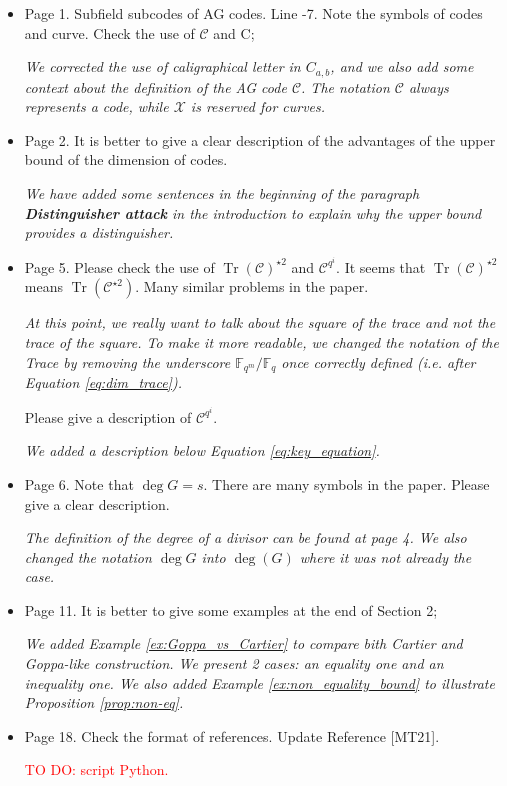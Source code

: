 \documentclass[12pt,a4paper]{amsart}
\newcommand\TODO[1]{\textcolor{red}{TO DO: #1}}
\DeclareMathOperator{\trace}{Tr}
\newcommand{\calC}{\mathcal{C}}
\newcommand{\calX}{\mathcal{X}}
\newcommand{\Tr}[1]{\trace\!\left(#1\right)}
\begin{document}
\begin{itemize}
 
\item  Page 1. Subfield subcodes of AG codes. Line -7. Note the symbols of codes and curve. Check the use of $\calC$ and C; 

\textit{We corrected the use of caligraphical letter in $C_{a,b}$, and we also add some context about the definition of the AG code $\calC$. The notation $\calC$ always represents a code, while $\calX$ is reserved for curves.}
 
\item Page 2. It is better to give a clear description of the advantages of the upper bound of the dimension of codes.

\textit{We have added some sentences in the beginning of the paragraph \textbf{Distinguisher attack} in the introduction to explain why the upper bound provides a distinguisher.}


\item  Page 5. Please check the use of $\Tr{\calC}^{\star 2}$ and $\calC^{q^i}$. It seems that $\Tr{\calC}^{\star 2}$ means $\Tr{\calC^{\star 2}}$. Many similar problems in the paper.

\textit{At this point, we really want to talk about the square of the trace and not the trace of the square. To make it more readable, we changed the notation of the Trace by removing the underscore $\mathbb{F}_{q^m}/\mathbb{F}_q$ once correctly defined (i.e. after Equation \eqref{eq:dim_trace}).}

\noindent Please give a description of $\calC^{q^i}$.
 
\textit{We added a description below Equation \eqref{eq:key_equation}.}

\item Page 6. Note that $\deg G = s$. There are many symbols in the paper. Please give a clear description.

\textit{The definition of the degree of a divisor can be found at page 4. We also changed the notation $\deg G$ into $\deg(G)$ where it was not already the case.}


\item Page 11. It is better to give some examples at the end of Section 2;

\textit{We added Example \ref{ex:Goppa_vs_Cartier} to compare bith Cartier and Goppa-like construction. We present 2 cases: an equality one and an inequality one. We also added Example \ref{ex:non_equality_bound} to illustrate Proposition \ref{prop:non-eq}.}



\item Page 18. Check the format of references. Update Reference [MT21].

\TODO{script Python.} 

\end{itemize} 
\end{document}
